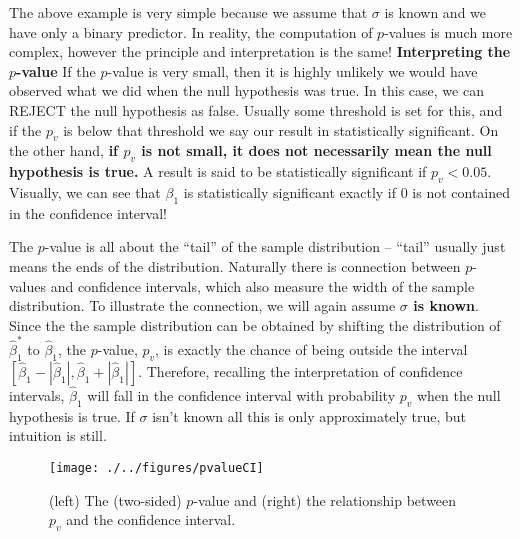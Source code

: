  The above example is very simple because we assume that $\sigma$ is known and we have only a binary predictor. In reality, the computation of $p$-values is much more complex, however the principle and interpretation is the same!
 {\bf Interpreting the $p$-value} If the $p$-value is very small, then it is highly unlikely we would have observed what we did when the null hypothesis was true. In this case, we can REJECT the null hypothesis as false. Usually some threshold is set for this, and if the $p_v$ is below that threshold we say our result in statistically significant. On the other hand, {\bf if $p_v$ is not small, it does not necessarily mean the null hypothesis is true.} A result is said to be statistically significant if $p_v<0.05$. Visually, we can see that $\beta_1$ is statistically significant exactly if $0$ is not contained in the confidence interval! 
 
 
The $p$-value is all about the ``tail'' of the sample distribution -- ``tail'' usually just means the ends of the distribution. Naturally there is connection between $p$-values and confidence intervals, which also measure the width of the sample distribution. To illustrate the connection, we will again assume {\bf $\sigma$ is known}.  Since the  the sample distribution can be obtained by shifting the distribution of $\hat{\beta}_1^*$ to $\hat{\beta}_1$, the $p$-value, $p_v$, is exactly the chance of being outside the interval $[\hat{\beta}_1 - |\hat{\beta}_1|,\hat{\beta}_1 + |\hat{\beta}_1|]$. Therefore,  recalling the interpretation of confidence intervals, $\hat{\beta}_1$ will fall in the confidence interval with probability $p_v$ when the null hypothesis is true.  If $\sigma$ isn't known all this is only approximately true, but intuition is still. 



\begin{figure}[h]
\centering
\texttt{[image: ./../figures/pvalueCI]}
\caption{(left) The (two-sided) $p$-value and (right) the relationship between $p_v$ and the confidence interval. }\label{fig:pvalue}
\end{figure}




\newpage

